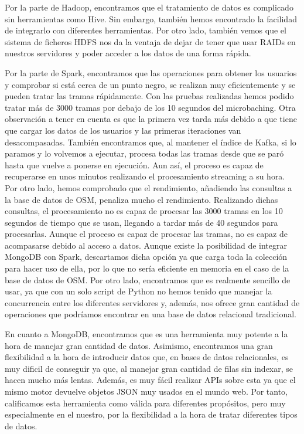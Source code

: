 Por la parte de Hadoop, encontramos que el tratamiento de datos es
complicado sin herramientas como Hive. Sin embargo, también hemos
encontrado la facilidad de integrarlo con diferentes herramientas. Por otro
lado, también vemos que el sistema de ficheros HDFS nos da la ventaja de
dejar de tener que usar RAIDs en nuestros servidores y poder acceder a los
datos de una forma rápida.

Por la parte de Spark, encontramos que las operaciones para obtener los
usuarios y comprobar si está cerca de un punto negro, se realizan muy
eficientemente y se pueden tratar las tramas rápidamente. Con las pruebas
realizadas hemos podido tratar más de 3000 tramas por debajo de los 10
segundos del microbaching. Otra observación a tener en cuenta es que la
primera vez tarda más debido a que tiene que cargar los datos de los
usuarios y las primeras iteraciones van desacompasadas. También encontramos
que, al mantener el índice de Kafka, si lo paramos y lo volvemos a
ejecutar, procesa todas las tramas desde que se paró hasta que vuelve a
ponerse en ejecución. Aun así, el proceso es capaz de recuperarse en unos
minutos realizando el procesamiento streaming a su hora. Por otro lado,
hemos comprobado que el rendimiento, añadiendo las consultas a la base de
datos de OSM, penaliza mucho el rendimiento. Realizando dichas consultas,
el procesamiento no es capaz de procesar las 3000 tramas en los 10 segundos
de tiempo que se usan, llegando a tardar más de 40 segundos para
procesarlas. Aunque el proceso es capaz de procesar las tramas, no es capaz
de acompasarse debido al acceso a datos. Aunque existe la posibilidad de
integrar MongoDB con Spark, descartamos dicha opción ya que carga toda la
colección para hacer uso de ella, por lo que no sería eficiente en memoria
en el caso de la base de datos de OSM. Por otro lado, encontramos que es
realmente sencillo de usar, ya que con un solo script de Python no hemos
tenido que manejar la concurrencia entre los diferentes servidores y,
además, nos ofrece gran cantidad de operaciones que podríamos encontrar en
una base de datos relacional tradicional.

En cuanto a MongoDB, encontramos que es una herramienta muy potente a la
hora de manejar gran cantidad de datos. Asimismo, encontramos una gran
flexibilidad a la hora de introducir datos que, en bases de datos
relacionales, es muy dificil de conseguir ya que, al manejar gran cantidad
de filas sin indexar, se hacen mucho más lentas. Además, es muy fácil
realizar APIs sobre esta ya que el mismo motor devuelve objetos JSON muy
usados en el mundo web. Por tanto, calificamos esta herramienta como válida
para diferentes propósitos, pero muy especialmente en el nuestro, por la
flexibilidad a la hora de tratar diferentes tipos de datos.

